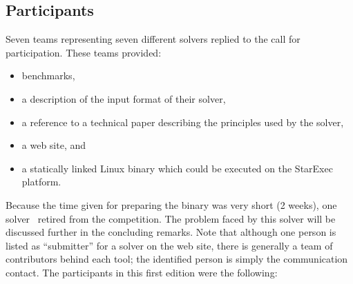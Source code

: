 \documentclass[twoside,11pt]{article}
\begin{document}
\subsection{Participants}
Seven teams representing seven different solvers replied to the call for participation.
These teams provided:
\begin{itemize}
\item benchmarks, 
\item a description of the input format of their solver, 
\item a reference to a technical paper describing the principles used by the solver, 
\item a web site, and
\item a statically linked Linux binary which could be executed on the StarExec platform.
\end{itemize}
Because the time given for preparing the binary was very short (2 weeks), one solver~\cite{HasseIOP13}
retired from the competition. The problem faced by this solver will be discussed further in the concluding remarks.
%
Note that although one person is listed as ``submitter'' for a solver on the web site,
there is generally a team of contributors behind each tool; the identified person is simply the communication contact.
%
The participants in this first edition were the following:

\end{document}
